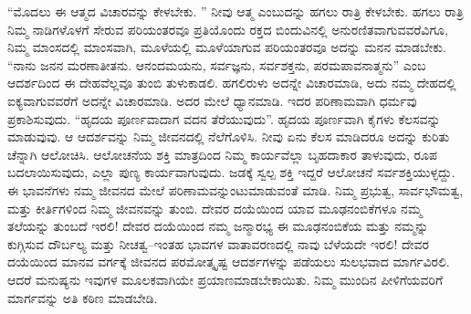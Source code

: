 “ಮೊದಲು ಈ ಆತ್ಮದ ವಿಚಾರವನ್ನು ಕೇಳಬೇಕು. ” ನೀವು ಆತ್ಮ ಎಂಬುದನ್ನು ಹಗಲು ರಾತ್ರಿ ಕೇಳಬೇಕು. ಹಗಲು ರಾತ್ರಿ ನಿಮ್ಮ ನಾಡಿಗಳೊಳಗೆ ಸೇರುವ ಪರಿಯಂತರವೂ ಪ್ರತಿಯೊಂದು ರಕ್ತದ ಬಿಂದುವಿನಲ್ಲಿ ಅನುರಣಿತವಾಗುವವರೆವಿಗೂ, ನಿಮ್ಮ ಮಾಂಸದಲ್ಲಿ ಮಾಂಸವಾಗಿ, ಮೂಳೆಯಲ್ಲಿ ಮೂಳೆಯಾಗುವ ಪರಿಯಂತರವೂ ಅದನ್ನು ಮನನ ಮಾಡಬೇಕು. “ನಾನು ಜನನ ಮರಣಾತೀತನು. ಆನಂದಮಯನು, ಸರ್ವಜ್ಞನು, ಸರ್ವಶಕ್ತನು, ಪರಮಪಾವನಾತ್ಮನು” ಎಂಬ ಆದರ್ಶದಿಂದ ಈ ದೇಹವೆಲ್ಲವೂ ತುಂಬಿ ತುಳುಕಾಡಲಿ. ಹಗಲಿರುಳು ಅದನ್ನೇ ವಿಚಾರಮಾಡಿ, ಅದು ನಮ್ಮ ದೇಹದಲ್ಲಿ ಐಕ್ಯವಾಗುವವರೆಗೆ ಅದನ್ನೇ ವಿಚಾರಮಾಡಿ. ಅದರ ಮೇಲೆ ಧ್ಯಾನಮಾಡಿ. ಇದರ ಪರಿಣಾಮವಾಗಿ ಧರ್ಮವು ಪ್ರಕಾಶಿಸುವುದು. “ಹೃದಯ ಪೂರ್ಣವಾದಾಗ ವದನ ತೆರೆಯುವುದು”. ಹೃದಯ ಪೂರ್ಣವಾಗಿ ಕೈಗಳು ಕೆಲಸವನ್ನು ಮಾಡುವುವು. ಆ ಆದರ್ಶವನ್ನು ನಿಮ್ಮ ಜೀವನದಲ್ಲಿ ನೆಲೆಗೊಳಿಸಿ. ನೀವು ಏನು ಕೆಲಸ ಮಾಡಿದರೂ ಅದನ್ನು ಕುರಿತು ಚೆನ್ನಾಗಿ ಆಲೋಚಿಸಿ. ಆಲೋಚನೆಯ ಶಕ್ತಿ ಮಾತ್ರದಿಂದ ನಿಮ್ಮ ಕಾರ್ಯವೆಲ್ಲಾ ಬೃಹದಾಕಾರ ತಾಳುವುದು, ರೂಪ ಬದಲಾಯಿಸುವುದು, ಎಲ್ಲಾ ಪುಣ್ಯ ಕಾರ್ಯವಾಗುವುದು. ಜಡಕ್ಕೆ ಸ್ವಲ್ಪ ಶಕ್ತಿ ಇದ್ದರೆ ಆಲೋಚನೆ ಸರ್ವಶಕ್ತಿಯುಳ್ಳದ್ದು. ಈ ಭಾವನೆಗಳು ನಮ್ಮ ಜೀವನದ ಮೇಲೆ ಪರಿಣಾಮವನ್ನುಂಟುಮಾಡುವಂತೆ ಮಾಡಿ. ನಿಮ್ಮ ಪ್ರಭುತ್ವ, ಸಾರ್ವಭೌಮತ್ವ, ಮತ್ತು ಕೀರ್ತಿಗಳಿಂದ ನಿಮ್ಮ ಜೀವನವನ್ನು ತುಂಬಿ. ದೇವರ ದಯೆಯಿಂದ ಯಾವ ಮೂಢನಂಬಿಕೆಗಳೂ ನಮ್ಮ ತಲೆಯನ್ನು ತುಂಬದೆ ಇರಲಿ! ದೇವರ ದಯೆಯಿಂದ ನಮ್ಮ ಜನ್ಮಾರಭ್ಯ ಈ ಮೂಢನಂಬಿಕೆಯ ಮತ್ತು ನಮ್ಮನ್ನು ಕುಗ್ಗಿಸುವ ದೌರ್ಬಲ್ಯ ಮತ್ತು ನೀಚತ್ವ–ಇಂತಹ ಭಾವಗಳ ವಾತಾವರಣದಲ್ಲಿ ನಾವು ಬೆಳೆಯದೇ ಇರಲಿ! ದೇವರ ದಯೆಯಿಂದ ಮಾನವ ವರ್ಗಕ್ಕೆ ಜೀವನದ ಪರಮೋತ್ಕೃಷ್ಟ ಆದರ್ಶಗಳನ್ನು ಪಡೆಯಲು ಸುಲಭವಾದ ಮಾರ್ಗವಿರಲಿ. ಆದರೆ ಮನುಷ್ಯನು ಇವುಗಳ ಮೂಲಕವಾಗಿಯೇ ಪ್ರಯಾಣಮಾಡಬೇಕಾಯಿತು. ನಿಮ್ಮ ಮುಂದಿನ ಪೀಳಿಗೆಯವರಿಗೆ ಮಾರ್ಗವನ್ನು ಅತಿ ಕಠಿಣ ಮಾಡಬೇಡಿ. 

\vskip 8pt


